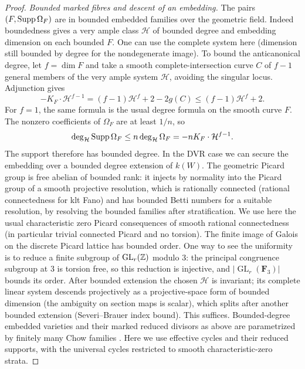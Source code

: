 \begin{proof}
\emph{Bounded marked fibres and descent of an embedding.}
The pairs \((F,{\rm Supp}\,\Omega_F)\) are in bounded embedded families over the geometric field.
Indeed boundedness gives a very ample class \(\mathcal H\) of bounded degree and embedding dimension on each bounded \(F\).
One can use the complete system here (dimension still bounded by degree for the nondegenerate image).
To bound the anticanonical degree, let \(f=\dim F\) and take a
smooth complete-intersection curve \(C\) of \(f-1\) general members
of the very ample system \(\mathcal H\), avoiding the singular
locus.  Adjunction gives
\[
 -K_F\cdot\mathcal H^{f-1}
   =(f-1)\mathcal H^f+2-2g(C)
   \le (f-1)\mathcal H^f+2 .
\]
For \(f=1\), the same formula is the usual degree formula on the
smooth curve \(F\).
The nonzero coefficients of \(\Omega_F\) are at least \(1/n\),
so
\[
 \deg_{\mathcal H}\operatorname{Supp}\Omega_F
 \le n\deg_{\mathcal H}\Omega_F
 =-n K_F\cdot\mathcal H^{f-1}.
\]
The support therefore has bounded degree.
In the DVR case we can secure the embedding over a bounded degree extension of \(k(W)\).
The geometric Picard group is free abelian of bounded rank: it injects by normality into the Picard group of a smooth projective resolution, which is rationally connected (rational connectedness for klt Fano) and has bounded Betti numbers for a suitable resolution, by resolving the bounded families after stratification.
We use here the usual characteristic zero Picard consequences of smooth rational connectedness (in particular trivial connected Picard and no torsion).
The finite image of Galois on the discrete Picard lattice has bounded
order.  One way to see the uniformity is to reduce a finite subgroup of
\(\operatorname{GL}_r(\mathbb Z)\) modulo \(3\): the principal congruence
subgroup at \(3\) is torsion free, so this reduction is injective, and
\(\lvert\operatorname{GL}_r(\mathbf F_3)\rvert\) bounds its order.
After bounded extension the chosen \(\mathcal H\) is invariant; its complete linear system descends projectively as a projective-space form of bounded dimension (the ambiguity on section maps is scalar), which splits after another bounded extension (Severi--Brauer index bound).
This suffices.
Bounded-degree embedded varieties and their marked reduced divisors as
above are parametrized by finitely many Chow families
\cite[Definition~3.21, (3.21.1)--(3.21.3)]{KollarChow2017}.
Here we use effective cycles and their reduced supports, with the
universal cycles restricted to smooth characteristic-zero strata.


\end{proof}
